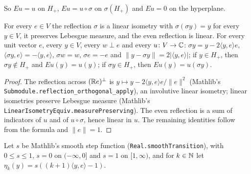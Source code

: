 So $E u = u$ on $H_+$, $E u = u \circ \sigma$ on $\sigma(H_+)$ and $E u = 0$ on the hyperplane.

\begin{lemma}
\label{lem:half-space-reflection}
\leanok
{}
For every $e \in V$ the reflection $\sigma$ is a linear isometry with $\sigma(\sigma y) = y$ for
every $y \in V$, it preserves Lebesgue measure, and the even reflection is linear. For every
unit vector $e$, every $y \in V$,
every $w \perp e$ and every $u \colon V \to \mathbb{C}$:
$\sigma y = y - 2 \langle y, e \rangle e$, $\langle \sigma y, e \rangle = -\langle y, e \rangle$,
$\sigma w = w$, $\sigma e = -e$ and $\|y - \sigma y\| = 2 |\langle y, e \rangle|$; if $y \in H_+$,
then $\sigma y \notin H_+$ and $E u(y) = u(y)$; if $\sigma y \in H_+$, then
$E u(y) = u(\sigma y)$.
\end{lemma}

\begin{proof}
\leanok
The reflection across $(\mathbb{R} e)^\perp$ is $y \mapsto y - 2 \langle y, e \rangle e / \|e\|^2$
(Mathlib's \texttt{Submodule.\allowbreak reflection\_\allowbreak orthogonal\_\allowbreak apply}),
an involutive linear isometry; linear isometries preserve Lebesgue measure (Mathlib's
\texttt{LinearIsometryEquiv.\allowbreak measurePreserving}). The even reflection is a sum of
indicators of $u$ and of $u \circ \sigma$, hence linear in $u$. The remaining identities follow
from the formula and $\|e\| = 1$.
\end{proof}

Let $s$ be Mathlib's smooth step function (\texttt{Real.\allowbreak smoothTransition}), with
$0 \leq s \leq 1$, $s = 0$ on $(-\infty, 0]$ and $s = 1$ on $[1, \infty)$, and for $k \in \mathbb{N}$ let
$\eta_k(y) = s((k + 1) \langle y, e \rangle - 1)$.

